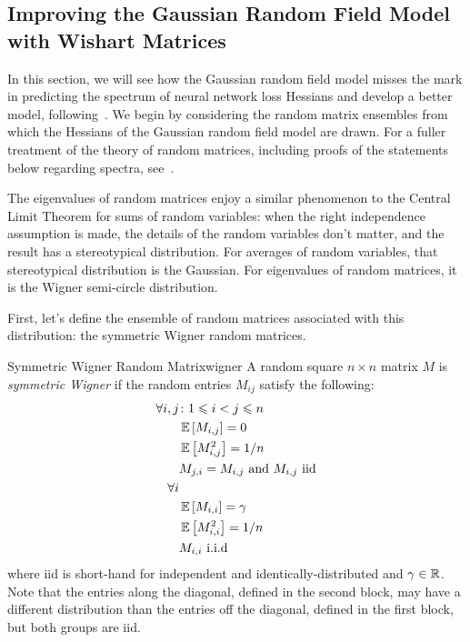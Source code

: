 \documentclass[../../thesis.tex]{subfiles}
\begin{document}
\subsection{Improving the Gaussian Random Field Model with Wishart Matrices}

In this section, we will see
how the Gaussian random field model misses the mark
in predicting the spectrum of neural network loss Hessians
and develop a better model, following~\cite{pennington2017}.
We begin by considering the random matrix ensembles
from which the Hessians of the Gaussian random field model
are drawn.
For a fuller treatment of the theory of random matrices,
including proofs of the statements below regarding spectra,
see~\cite{feier2012,tao2012}.

The eigenvalues of random matrices enjoy a similar phenomenon
to the Central Limit Theorem for sums of random variables:
when the right independence assumption is made,
the details of the random variables don't matter,
and the result has a stereotypical distribution.
For averages of random variables,
that stereotypical distribution is the Gaussian.
For eigenvalues of random matrices,
it is the Wigner semi-circle distribution.

First, let's define the ensemble of random matrices
associated with this distribution:
the symmetric Wigner random matrices.
\begin{definition}{Symmetric Wigner Random Matrix}{wigner}
	A random square $n\times n$ matrix $M$ is \emph{symmetric Wigner}
	if the random entries $M_{ij}$ satisfy the following:
	\begin{align*}
		\forall i,j &\suchthat 1 \leq i < j \leq n\\
			&\Ex{M_{i, j}} = 0\\
			&\Ex{M_{i, j}^2} = 1/n\\
			&M_{j, i} = M_{i, j} \text{\ and\ } M_{i, j} \text{\ iid}\\
		\forall i\\
			&\Ex{M_{i, i}} = \gamma\\
			&\Ex{M_{i, i}^2} = 1/n\\
			&M_{i, i} \text{\ i.i.d}
	\end{align*}
	where iid is short-hand for independent
	and identically-distributed
	and $\gamma \in \mathbb{R}$.
	Note that the entries along the diagonal,
	defined in the second block,
	may have a different
	distribution than the entries off the diagonal,
	defined in the first block,
	but both groups are iid.
\end{definition}
\end{document}
